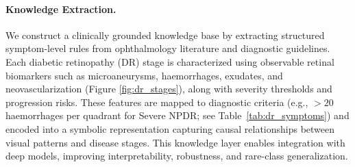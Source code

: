 \documentclass{article}
\begin{document}
\paragraph{Knowledge Extraction.}
We construct a clinically grounded knowledge base by extracting structured symptom-level rules from ophthalmology literature and diagnostic guidelines. Each diabetic retinopathy (DR) stage is characterized using observable retinal biomarkers such as microaneurysms, haemorrhages, exudates, and neovascularization (Figure \ref{fig:dr_stages}), along with severity thresholds and progression risks. These features are mapped to diagnostic criteria (e.g., $>20$ haemorrhages per quadrant for Severe NPDR; see Table~\ref{tab:dr_symptoms}) and encoded into a symbolic representation capturing causal relationships between visual patterns and disease stages. This knowledge layer enables integration with deep models, improving interpretability, robustness, and rare-class generalization.
\end{document}
